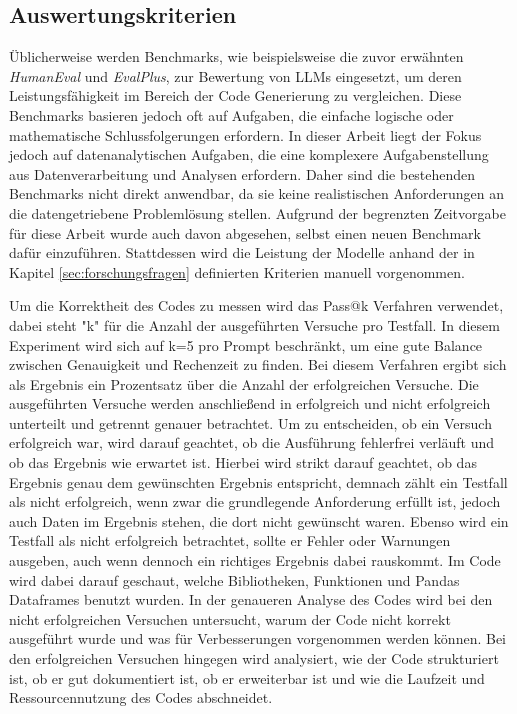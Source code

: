 \documentclass[11pt,a4paper]{article}
\begin{document}
\subsection{Auswertungskriterien}
\label{sec:auswertungskriterien}
    Üblicherweise werden Benchmarks, wie beispielsweise die zuvor erwähnten \emph{HumanEval}\cite{chen2021evaluatinglargelanguagemodels} und \emph{EvalPlus}\cite{evalplus}, zur Bewertung von LLMs eingesetzt, um deren Leistungsfähigkeit im Bereich der Code Generierung zu vergleichen. Diese Benchmarks basieren jedoch oft auf Aufgaben, die einfache logische oder mathematische Schlussfolgerungen erfordern. In dieser Arbeit liegt der Fokus jedoch auf datenanalytischen Aufgaben, die eine komplexere Aufgabenstellung aus Datenverarbeitung und Analysen erfordern. Daher sind die bestehenden Benchmarks nicht direkt anwendbar, da sie keine realistischen Anforderungen an die datengetriebene Problemlösung stellen. Aufgrund der begrenzten Zeitvorgabe für diese Arbeit wurde auch davon abgesehen, selbst einen neuen Benchmark dafür einzuführen. Stattdessen wird die Leistung der Modelle anhand der in Kapitel \ref{sec:forschungsfragen} definierten Kriterien manuell vorgenommen.
    
    Um die Korrektheit des Codes zu messen wird das Pass@k Verfahren verwendet, dabei steht "k" für die Anzahl der ausgeführten Versuche pro Testfall. In diesem Experiment wird sich auf k=5 pro Prompt beschränkt, um eine gute Balance zwischen Genauigkeit und Rechenzeit zu finden. Bei diesem Verfahren ergibt sich als Ergebnis ein Prozentsatz über die Anzahl der erfolgreichen Versuche. Die ausgeführten Versuche werden anschließend in erfolgreich und nicht erfolgreich unterteilt und getrennt genauer betrachtet. Um zu entscheiden, ob ein Versuch erfolgreich war, wird darauf geachtet, ob die Ausführung fehlerfrei verläuft und ob das Ergebnis wie erwartet ist. Hierbei wird strikt darauf geachtet, ob das Ergebnis genau dem gewünschten Ergebnis entspricht, demnach zählt ein Testfall als nicht erfolgreich, wenn zwar die grundlegende Anforderung erfüllt ist, jedoch auch Daten im Ergebnis stehen, die dort nicht gewünscht waren. Ebenso wird ein Testfall als nicht erfolgreich betrachtet, sollte er Fehler oder Warnungen ausgeben, auch wenn dennoch ein richtiges Ergebnis dabei rauskommt. Im Code wird dabei darauf geschaut, welche Bibliotheken, Funktionen und Pandas Dataframes benutzt wurden.
    In der genaueren Analyse des Codes wird bei den nicht erfolgreichen Versuchen untersucht, warum der Code nicht korrekt ausgeführt wurde und was für Verbesserungen vorgenommen werden können. Bei den erfolgreichen Versuchen hingegen wird analysiert, wie der Code strukturiert ist, ob er gut dokumentiert ist, ob er erweiterbar ist und wie die Laufzeit und Ressourcennutzung des Codes abschneidet.
\end{document}
